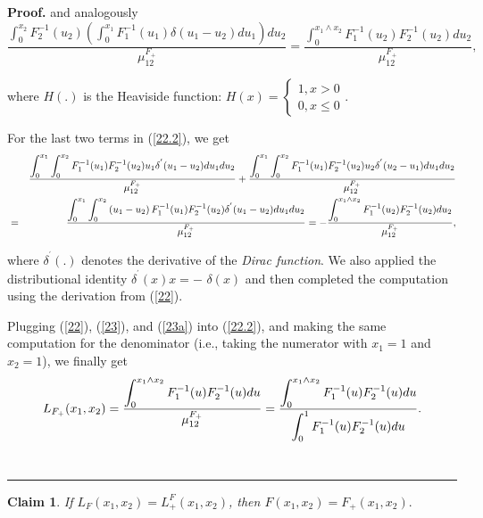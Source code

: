 \documentclass[onecolumn]{article}
\providecommand{\dint}{\displaystyle\int}
\newtheorem{claim}[theorem]{Claim}
\newenvironment{proof}[1][Proof]{\noindent\textbf{#1.} }{\ \rule{0.5em}{0.5em}}
\renewcommand{\dint}{\displaystyle\int}
\begin{document}
\begin{proof}
and analogously 
\begin{equation}
\frac{\dint\nolimits_{0}^{x_{2}}F_{2}^{-1}(u_{2})\left(
\dint\nolimits_{0}^{x_{1}}F_{1}^{-1}(u_{1})\delta (u_{1}-u_{2})du_{1}\right)
du_{2}}{\mu _{12}^{F_{+}}}=\frac{\dint\nolimits_{0}^{x_{1}\wedge
x_{2}}F_{1}^{-1}(u_{2})F_{2}^{-1}(u_{2})du_{2}}{\mu _{12}^{F_{+}}},
\label{23}
\end{equation}

where $H(.)$ is the Heaviside function: $H(x)=\left\{ 
\begin{array}{c}
1,x>0 \\ 
0,x\leq 0%
\end{array}%
\right. .$

For the last two terms in (\ref{22.2}), we get%
\begin{eqnarray}
&&\frac{\dint\nolimits_{0}^{x_{1}}\dint%
\nolimits_{0}^{x_{2}}F_{1}^{-1}(u_{1})F_{2}^{-1}(u_{2})u_{1}\delta
^{^{\prime }}(u_{1}-u_{2})du_{1}du_{2}}{\mu _{12}^{F_{+}}}+\frac{%
\dint\nolimits_{0}^{x_{1}}\dint%
\nolimits_{0}^{x_{2}}F_{1}^{-1}(u_{1})F_{2}^{-1}(u_{2})u_{2}\delta
^{^{\prime }}(u_{2}-u_{1})du_{1}du_{2}}{\mu _{12}^{F_{+}}}  \notag \\
&=&\frac{\dint\nolimits_{0}^{x_{1}}\dint\nolimits_{0}^{x_{2}}\left(
u_{1}-u_{2}\right) F_{1}^{-1}(u_{1})F_{2}^{-1}(u_{2})\delta ^{^{\prime
}}(u_{1}-u_{2})du_{1}du_{2}}{\mu _{12}^{F_{+}}}=-\frac{\dint%
\nolimits_{0}^{x_{1}\wedge x_{2}}F_{1}^{-1}(u_{2})F_{2}^{-1}(u_{2})du_{2}}{%
\mu _{12}^{F_{+}}},  \label{23a}
\end{eqnarray}

where $\delta ^{^{\prime }}(.)$ denotes the derivative of the \textit{Dirac
function}. We also applied the distributional identity $\delta ^{^{\prime
}}(x)x=-$ $\delta (x)$ and then completed the computation using the
derivation from (\ref{22}).

Plugging (\ref{22}), (\ref{23}), and (\ref{23a}) into (\ref{22.2}), and
making the same computation for the denominator (i.e., taking the numerator
with $x_{1}=1$ and $x_{2}=1$), we finally get%
\begin{equation}
L_{F_{+}}(x_{1},x_{2})=\frac{\dint\nolimits_{0}^{x_{1}\wedge
x_{2}}F_{1}^{-1}(u)F_{2}^{-1}(u)du}{\mu _{12}^{F_{+}}}=\frac{%
\dint\nolimits_{0}^{x_{1}\wedge x_{2}}F_{1}^{-1}(u)F_{2}^{-1}(u)du}{%
\dint\nolimits_{0}^{1}F_{1}^{-1}(u)F_{2}^{-1}(u)du}.  \label{24}
\end{equation}
\end{proof}

\begin{claim}
\label{fh-claim2} If $L_{F}(x_{1},x_{2})=L_{+}^{F}(x_{1},x_{2})$, then $%
F(x_{1},x_{2})=F_{+}(x_{1},x_{2}).$
\end{claim}
\end{document}
